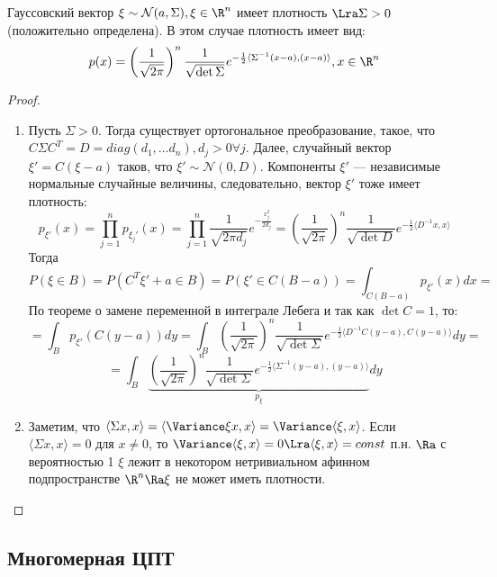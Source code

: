 \begin{theorem}[О плотности]
    Гауссовский вектор \(\xi \sim \mathcal{N}(a, \Sigma), \xi \in \R^n\) имеет плотность \(\Lra \Sigma > 0\) (положительно определена). В этом случае плотность имеет вид:
    \[p(x) = \left( \frac{1}{\sqrt{2\pi}} \right)^n \frac{1}{\sqrt{\det \Sigma}}e^{-\frac{1}{2}\langle \Sigma^{-1}(x - a), (x - a) \rangle}, x \in \R^n\]
\end{theorem}
\begin{proof}\indent
    \begin{enumerate}
        \item[\(\La\)] Пусть \(\Sigma > 0\). Тогда существует ортогональное преобразование, такое, что \(C\Sigma C^T = D = diag(d_1, \dots d_n), d_j > 0 \forall j\). Далее, случайный вектор \(\xi' = C(\xi - a)\) таков, что \(\xi' \sim \mathcal{N}(0, D)\). Компоненты \(\xi'\) --- независимые нормальные случайные величины, следовательно, вектор \(\xi'\) тоже имеет плотность:
        \[p_{\xi'}(x) = \prod_{j = 1}^n p_{\xi_j'}(x) = \prod_{j = 1}^n \frac{1}{\sqrt{2\pi d_j}}e^{-\frac{x_j^2}{2d_j}} = \left( \frac{1}{\sqrt{2\pi}} \right)^n \frac{1}{\sqrt{\det D}}e^{-\frac{1}{2}\langle D^{-1}x, x \rangle}\]
        Тогда
        \[P(\xi \in B) = P(C^T\xi' + a \in B) = P(\xi' \in C(B - a)) = \int_{C(B - a)}p_{\xi'}(x)dx = \]
        По теореме о замене переменной в интеграле Лебега и так как \(\det C = 1\), то:
        \[= \int_{B}p_{\xi'}(C(y - a))dy = \int_{B}\left( \frac{1}{\sqrt{2\pi}} \right)^n \frac{1}{\sqrt{\det \Sigma}}e^{-\frac{1}{2}\langle D^{-1}C(y - a), C(y - a) \rangle}dy = \]
        \[= \int_{B}\underbrace{\left( \frac{1}{\sqrt{2\pi}} \right)^n \frac{1}{\sqrt{\det \Sigma}}e^{-\frac{1}{2}\langle \Sigma^{-1}(y - a), (y - a) \rangle}}_{p_\xi}dy\]
        \item[\(\Ra\)] Заметим, что \(\langle \Sigma x, x \rangle = \langle \Variance \xi x, x \rangle = \Variance \langle \xi, x \rangle\). Если \(\langle \Sigma x, x \rangle = 0\) для \(x \ne 0\), то \(\Variance \langle \xi, x \rangle = 0 \Lra \langle \xi, x\rangle = const\) п.н. \(\Ra\) с вероятностью 1 \(\xi\) лежит в некотором нетривиальном афинном подпространстве \(\R^n \Ra \xi\) не может иметь плотности.
    \end{enumerate}
\end{proof}

\subsection{Многомерная ЦПТ}

